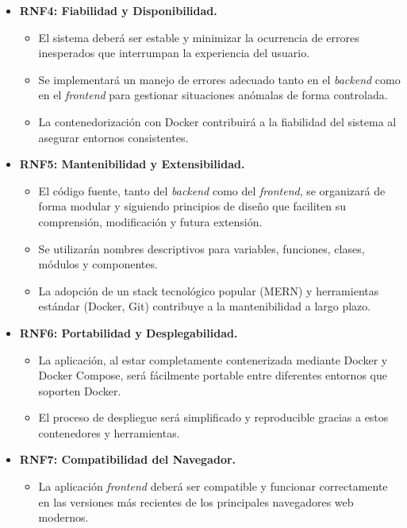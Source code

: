 \begin{itemize}
\begin{itemize}
        \item El \textit{frontend} se optimizará (ej. mediante el proceso de build de Vite) para asegurar una carga inicial rápida y una experiencia fluida.
    \end{itemize}
    \vspace{0.3cm}
    \item \textbf{RNF4: Fiabilidad y Disponibilidad.}
    \begin{itemize}
        \item El sistema deberá ser estable y minimizar la ocurrencia de errores inesperados que interrumpan la experiencia del usuario.
        \item Se implementará un manejo de errores adecuado tanto en el \textit{backend} como en el \textit{frontend} para gestionar situaciones anómalas de forma controlada.
        \item La contenedorización con Docker contribuirá a la fiabilidad del sistema al asegurar entornos consistentes.
    \end{itemize}
    \vspace{0.3cm}
    \item \textbf{RNF5: Mantenibilidad y Extensibilidad.}
    \begin{itemize}
        \item El código fuente, tanto del \textit{backend} como del \textit{frontend}, se organizará de forma modular y siguiendo principios de diseño que faciliten su comprensión, modificación y futura extensión.
        \item Se utilizarán nombres descriptivos para variables, funciones, clases, módulos y componentes.
        \item La adopción de un stack tecnológico popular (MERN) y herramientas estándar (Docker, Git) contribuye a la mantenibilidad a largo plazo.
    \end{itemize}
    \vspace{0.3cm}
    \item \textbf{RNF6: Portabilidad y Desplegabilidad.}
    \begin{itemize}
        \item La aplicación, al estar completamente contenerizada mediante Docker y Docker Compose, será fácilmente portable entre diferentes entornos que soporten Docker.
        \item El proceso de despliegue será simplificado y reproducible gracias a estos contenedores y herramientas.
    \end{itemize}
    \vspace{0.3cm}
    \item \textbf{RNF7: Compatibilidad del Navegador.}
    \begin{itemize}
        \item La aplicación \textit{frontend} deberá ser compatible y funcionar correctamente en las versiones más recientes de los principales navegadores web modernos.
    \end{itemize}
\end{itemize}

